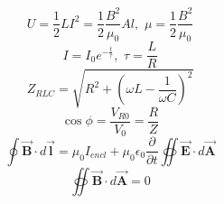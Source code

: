 \documentclass[12pt,landscape]{article}
\begin{document}
\begin{multicols}{4}
    \begin{equation*}
        U = \frac{1}{2} L I^2 = \frac{1}{2} \frac{B^2}{\mu_0} A l,\,\, \mu = \frac{1}{2} \frac{B^2}{\mu_0}
    \end{equation*}
    \begin{equation*}
        I = I_0 e^{-\frac{t}{\tau}},\,\, \tau = \frac{L}{R}
    \end{equation*}
    \begin{equation*}
        Z_{RLC} = \sqrt{R^2 + \left(\omega L - \frac{1}{\omega C}\right)^2}
    \end{equation*}
    \begin{equation*}
        \cos \phi = \frac{V_{R0}}{V_0} = \frac{R}{Z}
    \end{equation*}
    \begin{equation*}
        \oint \vec{\mathbf{B}} \cdot d \vec{\boldsymbol{l}} = \mu_0 I_{encl} + \mu_0 \epsilon_0 \frac{\partial}{\partial t} \oiint \vec{\mathbf{E}} \cdot d\vec{\mathbf{A}}
    \end{equation*}
    \begin{equation*}
        \oiint \vec{\mathbf{B}} \cdot d \vec{\mathbf{A}} = 0
    \end{equation*}

\end{multicols}
\end{document}
